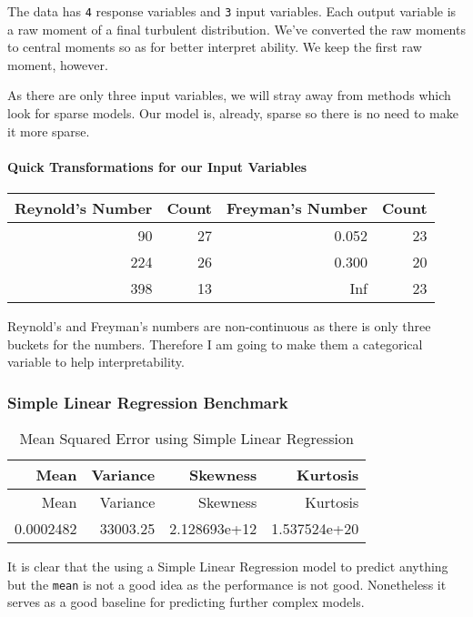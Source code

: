 \documentclass[
  letterpaper,
  DIV=11,
  numbers=noendperiod]{scrartcl}
\let\oldparagraph\paragraph
\renewcommand{\paragraph}[1]{\oldparagraph{#1}\mbox{}}
\begin{document}
The data has \texttt{4} response variables and \texttt{3} input
variables. Each output variable is a raw moment of a final turbulent
distribution. We've converted the raw moments to central moments so as
for better interpret ability. We keep the first raw moment, however.

As there are only three input variables, we will stray away from methods
which look for sparse models. Our model is, already, sparse so there is
no need to make it more sparse.

\hypertarget{quick-transformations-for-our-input-variables}{%
\paragraph{Quick Transformations for our Input
Variables}\label{quick-transformations-for-our-input-variables}}

\begin{longtable}[]{@{}rrrr@{}}
\toprule()
Reynold's Number & Count & Freyman's Number & Count \\
\midrule()
\endhead
90 & 27 & 0.052 & 23 \\
224 & 26 & 0.300 & 20 \\
398 & 13 & Inf & 23 \\
\bottomrule()
\end{longtable}

Reynold's and Freyman's numbers are non-continuous as there is only
three buckets for the numbers. Therefore I am going to make them a
categorical variable to help interpretability.

\hypertarget{simple-linear-regression-benchmark}{%
\subsubsection{Simple Linear Regression
Benchmark}\label{simple-linear-regression-benchmark}}

\begin{longtable}[]{@{}rrrr@{}}
\caption{Mean Squared Error using Simple Linear
Regression}\tabularnewline
\toprule()
Mean & Variance & Skewness & Kurtosis \\
\midrule()
\endfirsthead
\toprule()
Mean & Variance & Skewness & Kurtosis \\
\midrule()
\endhead
0.0002482 & 33003.25 & 2.128693e+12 & 1.537524e+20 \\
\bottomrule()
\end{longtable}

It is clear that the using a Simple Linear Regression model to predict
anything but the \texttt{mean} is not a good idea as the performance is
not good. Nonetheless it serves as a good baseline for predicting
further complex models.
\end{document}
